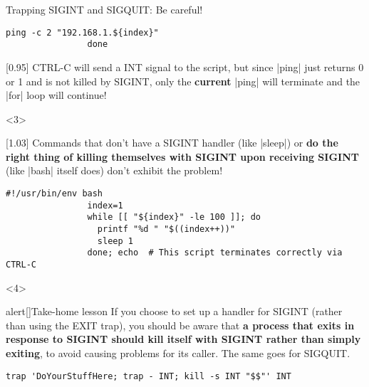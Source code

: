\begin{frame}[fragile]{Trapping SIGINT and SIGQUIT: Be careful!}
\begin{overlayarea}{\textwidth}{0.7\textheight}
\begin{onlyenv}
\begin{lstlisting}[style=MyBash, aboveskip=0mm, belowskip=-6mm]
                    ping -c 2 "192.168.1.${index}"
                done
            \end{lstlisting}
            \begin{varblock}{}[0.95\textwidth]{}
                \small CTRL-C will send a INT signal to the script, but since \bash|ping| just returns 0 or 1 and is not killed by SIGINT, only the \alert{\textbf{current}} \bash|ping| will terminate and the \bash|for| loop will continue!
            \end{varblock}
        \end{onlyenv}
        \begin{onlyenv}<3>
            \begin{varblock}{}[1.03\textwidth]{}
                Commands that don't have a SIGINT handler (like \bash|sleep|) or \textbf{do the right thing of killing themselves with SIGINT upon receiving SIGINT} (like \bash|bash| itself does) don't exhibit the problem!
            \end{varblock}
            \begin{lstlisting}[style=MyBash, firstnumber=5]
                #!/usr/bin/env bash
                index=1
                while [[ "${index}" -le 100 ]]; do
                  printf "%d " "$((index++))"
                  sleep 1
                done; echo  # This script terminates correctly via CTRL-C
            \end{lstlisting}
        \end{onlyenv}
        \begin{onlyenv}<4>
            \medskip
            \begin{varblock}{alert}[\textwidth]{\large Take-home lesson}
                If you choose to set up a handler for SIGINT (rather than using the EXIT trap), you should be aware that \alert{\textbf{a process that exits in response to SIGINT should kill itself with SIGINT rather than simply exiting}}, to avoid causing problems for its caller.
                The same goes for SIGQUIT.
            \end{varblock}
            \begin{lstlisting}[style=MyBash, numbers=none]
                trap 'DoYourStuffHere; trap - INT; kill -s INT "$$"' INT
            \end{lstlisting}
        \end{onlyenv}
    \end{overlayarea}
\end{frame}











